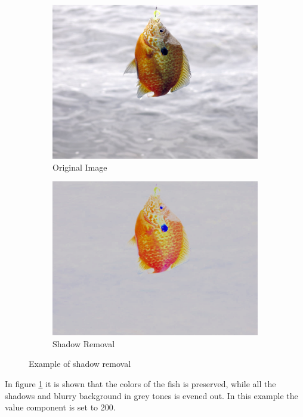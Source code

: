 \begin{figure}[h]
    \centering
    \begin{subfigure}{0.5\textwidth}
        \centering
        \includegraphics[width=.9\linewidth]{images/literature/colorfish}
        \caption{Original Image}
    \end{subfigure}%
    \begin{subfigure}{.5\textwidth}
        \centering
        \includegraphics[width=.9\linewidth]{images/literature/shadow_removal}
        \caption{Shadow Removal}
    \end{subfigure}
    \caption{Example of shadow removal}
    \label{fig:shadow_removal}
\end{figure}

In figure \ref{fig:shadow_removal} it is shown that the colors of the fish is preserved, while all the shadows and blurry background in grey tones is evened out. In this example the value component is set to 200.


